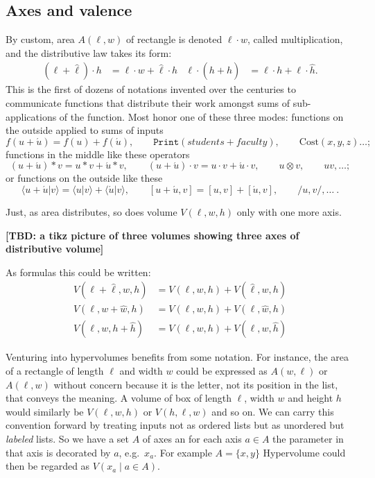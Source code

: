 \subsection{Axes and valence}

By custom, area $A(\ell,w)$ of rectangle is denoted $\ell \cdot w$, called
multiplication, and the distributive law takes its form:
\begin{align*}
    (\ell+\hat{\ell})\cdot h & = \ell \cdot w +\hat{\ell}\cdot h 
    &
    \ell \cdot (h+\hat{h}) & = \ell\cdot h +\ell\cdot \hat{h}.
\end{align*}
This is the first of dozens of notations invented over the centuries to communicate 
functions that distribute their work amongst sums of sub-applications of the function.  
Most honor one of these three modes:
functions on the outside applied to sums of inputs 
\[ 
    f(u+\acute{u})=f(u)+f(\acute{u}),\qquad 
    \texttt{Print}(students+faculty),\qquad
    \text{Cost}
    (x,y,z)\ldots;
\]
functions in the middle like these operators 
\[
    (u+\acute{u})*v=u*v+\acute{u}*v, \qquad 
    (u+\acute{u})\cdot v=u\cdot v+\acute{u}\cdot v,\qquad 
    u\otimes v, \qquad 
    uv,\ldots; 
\]
or functions on the outside like these
\[
    \langle u+\acute{u}|v\rangle=\langle u|v\rangle +\langle \acute{u}|v\rangle,\qquad 
    [u+\acute{u},v]=[u,v]+[\acute{u},v],\qquad  
    /u,v/,\ldots~.
\]
   
Just, as area distributes, so does volume $V(\ell,w,h)$ only with one more axis.
\begin{center}
    \textbf{[TBD: a tikz picture of three volumes showing three axes of distributive volume]}
\end{center}
As formulas this could be written:
\begin{align*}
    V(\ell+\hat{\ell},w,h) & = V(\ell,w,h)+V(\hat{\ell},w,h)\\
        V(\ell,w+\hat{w},h) & = V(\ell,w,h)+V(\ell,\hat{w},h)\\
        V(\ell,w,h+\hat{h}) & = V(\ell,w,h)+V(\ell,w,\hat{h})
\end{align*}

Venturing into hypervolumes benefits from some notation.  For instance, the area
of a rectangle of length $\ell$ and width $w$ could be expressed  as $A(w,\ell)$
or $A(\ell,w)$ without concern because it is the letter, not its position in the
list, that conveys the meaning.  A volume of box of length $\ell$, width $w$ and
height $h$ would similarly be $V(\ell,w,h)$ or $V(h,\ell,w)$ and so on.  
We can carry this convention forward by treating inputs not as ordered lists but 
as unordered but \emph{labeled} lists.  So we have a set $A$ of axes an for each 
axis $a\in A$ the parameter in that axis is decorated by $a$, e.g.\ $x_a$.
For example $A=\{x,y\}$
Hypervolume could then be regarded as $V(x_a\mid a\in A)$.

